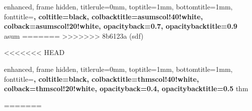 

{
  enhanced,
  frame hidden,
  titlerule=0mm,
  toptitle=1mm,
  bottomtitle=1mm,
  fonttitle=\bfseries\large,
  coltitle=black,
  colbacktitle=asumscol!40!white,
  colback=asumscol!20!white,
  opacityback=0.7, %
  opacitybacktitle=0.9
}{asum}
=======
>>>>>>> 8b6123a (sdf)



<<<<<<< HEAD

{
  enhanced,
  frame hidden,
  titlerule=0mm,
  toptitle=1mm,
  bottomtitle=1mm,
  fonttitle=\bfseries\large,
  coltitle=black,
  colbacktitle=thmscol!40!white,
  colback=thmscol!20!white,
  opacityback=0.4, %
  opacitybacktitle=0.5
}{thm}


=======

